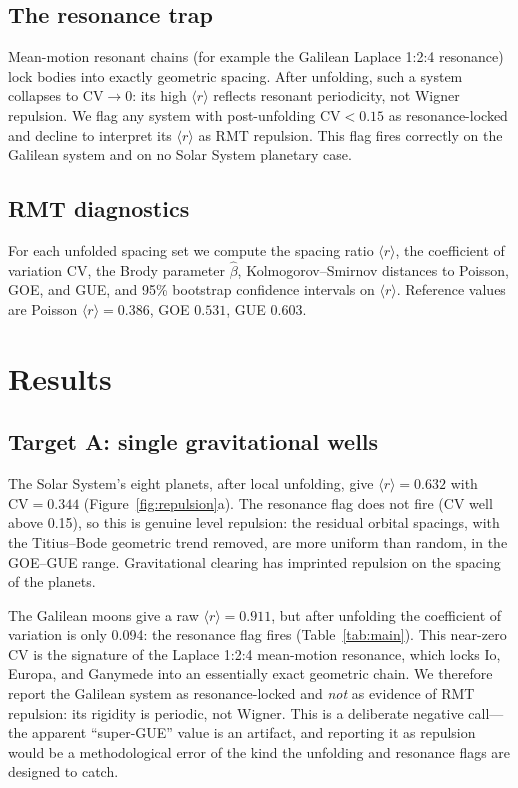\documentclass[12pt,a4paper]{article}
\begin{document}
\subsection{The resonance trap}

Mean-motion resonant chains (for example the Galilean Laplace 1:2:4 resonance) lock bodies into exactly geometric spacing. After unfolding, such a system collapses to $\mathrm{CV}\to0$: its high $\langle r\rangle$ reflects resonant periodicity, not Wigner repulsion. We flag any system with post-unfolding $\mathrm{CV}<0.15$ as resonance-locked and decline to interpret its $\langle r\rangle$ as RMT repulsion. This flag fires correctly on the Galilean system and on no Solar System planetary case.

\subsection{RMT diagnostics}

For each unfolded spacing set we compute the spacing ratio $\langle r\rangle$, the coefficient of variation CV, the Brody parameter $\hat\beta$, Kolmogorov--Smirnov distances to Poisson, GOE, and GUE, and 95\% bootstrap confidence intervals on $\langle r\rangle$. Reference values are Poisson $\langle r\rangle=0.386$, GOE $0.531$, GUE $0.603$.

\section{Results}

\subsection{Target A: single gravitational wells}

The Solar System's eight planets, after local unfolding, give $\langle r\rangle=0.632$ with $\mathrm{CV}=0.344$ (Figure~\ref{fig:repulsion}a). The resonance flag does not fire (CV well above 0.15), so this is genuine level repulsion: the residual orbital spacings, with the Titius--Bode geometric trend removed, are more uniform than random, in the GOE--GUE range. Gravitational clearing has imprinted repulsion on the spacing of the planets.

The Galilean moons give a raw $\langle r\rangle=0.911$, but after unfolding the coefficient of variation is only 0.094: the resonance flag fires (Table~\ref{tab:main}). This near-zero CV is the signature of the Laplace 1:2:4 mean-motion resonance, which locks Io, Europa, and Ganymede into an essentially exact geometric chain. We therefore report the Galilean system as resonance-locked and \emph{not} as evidence of RMT repulsion: its rigidity is periodic, not Wigner. This is a deliberate negative call---the apparent ``super-GUE'' value is an artifact, and reporting it as repulsion would be a methodological error of the kind the unfolding and resonance flags are designed to catch.
\end{document}
